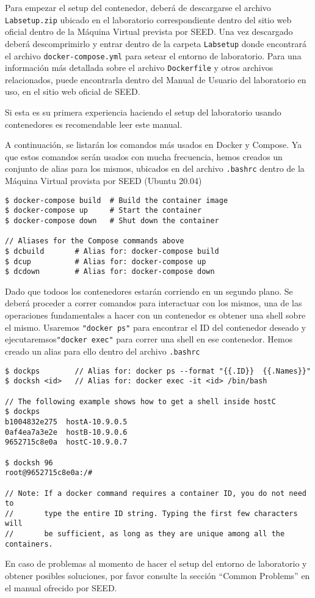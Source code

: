 Para empezar el setup del contenedor, deberá de descargarse el archivo \texttt{Labsetup.zip} ubicado en el laboratorio correspondiente dentro del sitio web oficial dentro de la Máquina Virtual prevista por SEED. Una vez descargado deberá descomprimirlo y entrar dentro de la carpeta \texttt{Labsetup} donde encontrará el archivo \texttt{docker-compose.yml} para setear el entorno de laboratorio. Para una información más detallada sobre el archivo \texttt{Dockerfile} y otros archivos relacionados, puede encontrarla dentro del Manual de Usuario del laboratorio en uso, en el sitio web oficial de SEED.

Si esta es su primera experiencia haciendo el setup del laboratorio usando contenedores es recomendable leer este manual.

A continuación, se listarán los comandos más usados en Docker y Compose.
Ya que estos comandos serán usados con mucha frecuencia, hemos creados un conjunto de alias para los mismos, ubicados en del archivo \texttt{.bashrc} dentro de la Máquina Virtual provista por SEED (Ubuntu 20.04)

\begin{lstlisting}
$ docker-compose build  # Build the container image
$ docker-compose up     # Start the container
$ docker-compose down   # Shut down the container

// Aliases for the Compose commands above
$ dcbuild       # Alias for: docker-compose build
$ dcup          # Alias for: docker-compose up
$ dcdown        # Alias for: docker-compose down
\end{lstlisting}


Dado que todoos los contenedores estarán corriendo en un segundo plano. Se deberá proceder a correr comandos para interactuar con los mismos, una de las operaciones fundamentales a hacer con un contenedor es obtener una shell sobre el mismo. Usaremos \texttt{"docker ps"} para encontrar el ID del contenedor deseado y ejecutaremsos\texttt{"docker exec"} para correr una shell en ese contenedor.
Hemos creado un alias para ello dentro del archivo \texttt{.bashrc}

\begin{lstlisting}
$ dockps        // Alias for: docker ps --format "{{.ID}}  {{.Names}}" 
$ docksh <id>   // Alias for: docker exec -it <id> /bin/bash

// The following example shows how to get a shell inside hostC
$ dockps
b1004832e275  hostA-10.9.0.5
0af4ea7a3e2e  hostB-10.9.0.6
9652715c8e0a  hostC-10.9.0.7

$ docksh 96
root@9652715c8e0a:/#  

// Note: If a docker command requires a container ID, you do not need to 
//       type the entire ID string. Typing the first few characters will 
//       be sufficient, as long as they are unique among all the containers. 
\end{lstlisting}

En caso de problemas al momento de hacer el setup del entorno de laboratorio y obtener posibles soluciones, por favor consulte la sección ``Common Problems'' en el manual ofrecido por SEED. 

